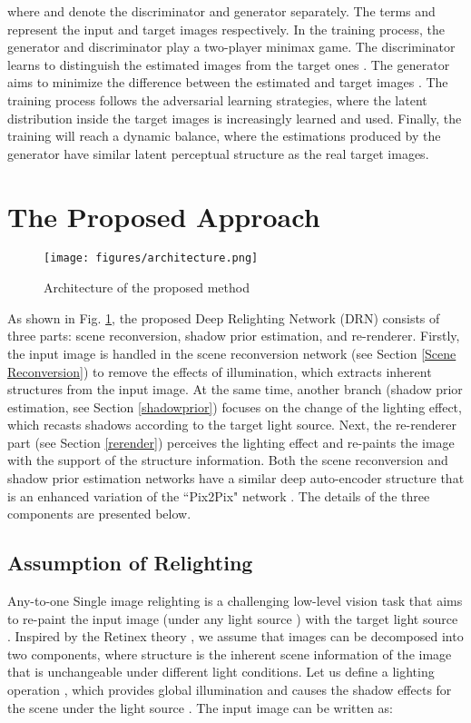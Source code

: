 \documentclass[runningheads]{llncs}
\begin{document}
where  and  denote the discriminator and generator separately. The terms  and  represent the input and target images respectively. In the training process, the generator and discriminator play a two-player minimax game. The discriminator learns to distinguish the estimated images  from the target ones . The generator aims to minimize the difference between the estimated  and target images . The training process follows the adversarial learning strategies, where the latent distribution inside the target images is increasingly learned and used. Finally, the training will reach a dynamic balance, where the estimations produced by the generator have similar latent perceptual structure as the real target images.

\vskip -0.1cm
\baselineskip 
\section{The Proposed Approach}
\baselineskip 

\begin{figure}[t]
    \centering
    \texttt{[image: figures/architecture.png]}
   \baselineskip 
    \caption{Architecture of the proposed method}
    \label{fig:arch}
   \baselineskip 
\end{figure}


As shown in Fig. \ref{fig:arch}, the proposed Deep Relighting Network (DRN) consists of three parts: scene reconversion, shadow prior estimation, and re-renderer. Firstly, the input image is handled in the scene reconversion network (see Section \ref{Scene Reconversion}) to remove the effects of  illumination, which extracts inherent structures from the input image. At the same time, another branch (shadow prior estimation, see Section \ref{shadowprior}) focuses on the change of the lighting effect, which recasts shadows according to the target light source. Next, the re-renderer part (see Section \ref{rerender}) perceives the lighting effect and re-paints the image with the support of the structure information. Both the scene reconversion and shadow prior estimation networks have a similar deep auto-encoder structure that is an enhanced variation of the ``Pix2Pix" network \cite{pix2pix}. The details of the three components are presented below. 
\baselineskip 
{}\baselineskip 
\subsection{Assumption of Relighting}
\label{assumption}
\baselineskip 
Any-to-one Single image relighting is a challenging low-level vision task that aims to re-paint the input image  (under any light source ) with the target light source . Inspired by the Retinex theory \cite{Retinex2004,RetinexNet}, we assume that images can be decomposed into two components, where structure  is the inherent scene information of the image that is unchangeable under different light conditions. Let us define a lighting operation , which provides global illumination and causes the shadow effects for the scene  under the light source . The input image can be written as:
\vskip -0.4cm
\baselineskip 
\end{document}
